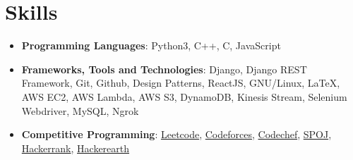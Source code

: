 \documentclass[a4paper,timesnewroman,11pt, twoside]{article}
\makeatletter
\numberwithin{equation}{section}
\newcommand{\resumeItem}[2]{
  \item\small{
    \textbf{#1}{: #2 \vspace{-5pt}}
  }
}
\newcommand{\resumeSubheadingk}[4]{
  \vspace{-3pt}\item
    \begin{tabular*}{0.97\textwidth}[t]{l@{\extracolsep{\fill}}r}
      \textbf{#1}  &\textit{#2} \\
    \end{tabular*}\vspace{-3.1pt}
}
\newcommand{\resumeSubHeadingListStart}{\begin{itemize}[leftmargin=*]}
\newcommand{\resumeSubHeadingListEnd}{\end{itemize}}
\newcommand{\resumeItemListStart}{\begin{itemize}}
\newcommand{\resumeItemListEnd}{\end{itemize}\vspace{-12pt}}
\makeatother
\begin{document}



\section{Skills}
 \resumeSubHeadingListStart
   \item{
     \textbf{Programming Languages}{: Python3, C++, C, JavaScript}
   }
   \item{
      \textbf{Frameworks, Tools and Technologies}{: Django, Django REST Framework, Git, Github, Design Patterns, ReactJS, GNU/Linux, LaTeX, AWS EC2, AWS Lambda, AWS S3, DynamoDB, Kinesis Stream, Selenium Webdriver, MySQL, Ngrok}
   }
   \item{
      \textbf{Competitive Programming}{: \href{https://www.leetcode.com/saxenakartik}{Leetcode}, \href{http://codeforces.com/profile/krtksxn}{Codeforces}, \href{https://www.codechef.com/users/kartik_saxena}{Codechef}, \href{https://www.spoj.com/users/kartik_s/}{SPOJ}, \href{https://www.hackerrank.com/kartiksaxena500}{Hackerrank}, \href{https://www.hackerearth.com/@saxenakartik}{Hackerearth}}
      \hfill
   }
 \resumeSubHeadingListEnd



\end{document}
